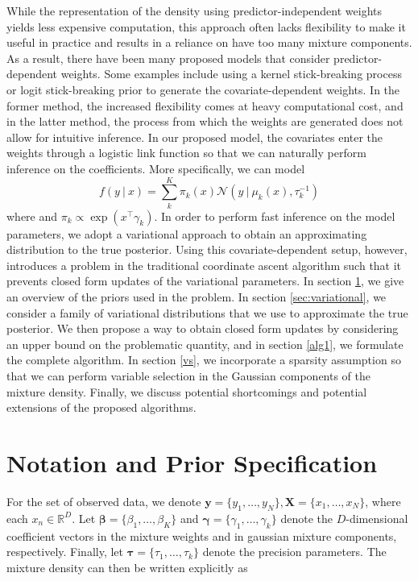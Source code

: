 \documentclass[twoside,11pt]{article}
\newcommand\given[1][]{\:#1\vert\:}
\newcommand{\transpose}[1]{#1^{\intercal}}
\newcommand{\R}{\mathbb{R}}
\newcommand{\boldbeta}{\boldsymbol\beta}
\newcommand{\boldgamma}{\boldsymbol\gamma}
\newcommand{\boldtau}{\boldsymbol\tau}
\begin{document}
While the representation of the density using predictor-independent weights yields less expensive computation, this approach often lacks flexibility to make it useful in practice and results in a reliance on have too many mixture components. As a result, there have been many proposed models that consider predictor-dependent weights. Some examples include using a kernel stick-breaking process \parencite{dunsonpark:08} or logit stick-breaking prior \parencite{durante:17} to generate the covariate-dependent weights. In the former method, the increased flexibility comes at heavy computational cost, and in the latter method, the process from which the weights are generated does not allow for intuitive inference. In our proposed model, the covariates enter the weights through a logistic link function so that we can naturally perform inference on the coefficients. More specifically, we can model
\begin{equation} \label{eq:covdep_gm}
	 f(y \given x) = \sum_{k}^{K} \pi_k(x) \mathcal{N} \left( y \given \mu_k(x), \tau_k^{-1} \right) 
\end{equation} 
where and $\pi_{k} \propto \exp(\transpose{x} \gamma_k)$. In order to perform fast inference on the model parameters, we adopt a variational approach to obtain an approximating distribution to the true posterior. Using this covariate-dependent setup, however, introduces a problem in the traditional coordinate ascent algorithm such that it prevents closed form updates of the variational parameters. In section \ref{sec:priors}, we give an overview of the priors used in the problem. In section \ref{sec:variational}, we consider a family of variational distributions that we use to approximate the true posterior. We then propose a way to obtain closed form updates by considering an upper bound on the problematic quantity, and in section \ref{alg1}, we formulate the complete algorithm. In section \ref{vs}, we incorporate a sparsity assumption so that we can perform variable selection in the Gaussian components of the mixture density. Finally, we discuss potential shortcomings and potential extensions of the proposed algorithms.

\section{Notation and Prior Specification} \label{sec:priors}
For the set of observed data, we denote $\mathbf{y} = \{y_1, \ldots, y_N \}, \mathbf{X} = \{ x_1, \ldots, x_N \}$, where each $x_n \in \R^{D}$. Let $\boldbeta = \{ \beta_1, \ldots, \beta_K\}$ and $\boldgamma = \{ \gamma_1, \ldots, \gamma_k\}$ denote the $D$-dimensional coefficient vectors  in the mixture weights and in gaussian mixture components, respectively. Finally, let $\boldtau = \{ \tau_1, \ldots, \tau_k \}$ denote the precision parameters. The mixture density can then be written explicitly as
\end{document}

